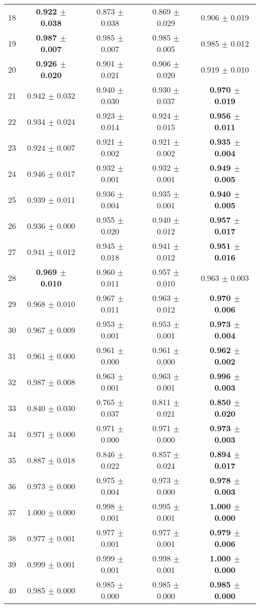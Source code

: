 \begin{table}[!ht]
{\begin{tabular}{r c c c c}
18 & \textbf{0.922 $\pm$ 0.038} & 0.873 $\pm$ 0.038 & 0.869 $\pm$ 0.029 & 0.906 $\pm$ 0.019 \\
19 & \textbf{0.987 $\pm$ 0.007} & 0.985 $\pm$ 0.007 & 0.985 $\pm$ 0.005 & 0.985 $\pm$ 0.012 \\
20 & \textbf{0.926 $\pm$ 0.020} & 0.901 $\pm$ 0.021 & 0.906 $\pm$ 0.020 & 0.919 $\pm$ 0.010 \\
21 & 0.942 $\pm$ 0.032 & 0.940 $\pm$ 0.030 & 0.930 $\pm$ 0.037 & \textbf{0.970 $\pm$ 0.019} \\
22 & 0.934 $\pm$ 0.024 & 0.923 $\pm$ 0.014 & 0.924 $\pm$ 0.015 & \textbf{0.956 $\pm$ 0.011} \\
23 & 0.924 $\pm$ 0.007 & 0.921 $\pm$ 0.002 & 0.921 $\pm$ 0.002 & \textbf{0.935 $\pm$ 0.004} \\
24 & 0.946 $\pm$ 0.017 & 0.932 $\pm$ 0.001 & 0.932 $\pm$ 0.001 & \textbf{0.949 $\pm$ 0.005} \\
25 & 0.939 $\pm$ 0.011 & 0.936 $\pm$ 0.004 & 0.935 $\pm$ 0.001 & \textbf{0.940 $\pm$ 0.005} \\
26 & 0.936 $\pm$ 0.000 & 0.955 $\pm$ 0.020 & 0.940 $\pm$ 0.012 & \textbf{0.957 $\pm$ 0.017} \\
27 & 0.941 $\pm$ 0.012 & 0.945 $\pm$ 0.018 & 0.941 $\pm$ 0.012 & \textbf{0.951 $\pm$ 0.016} \\
28 & \textbf{0.969 $\pm$ 0.010} & 0.960 $\pm$ 0.011 & 0.957 $\pm$ 0.010 & 0.963 $\pm$ 0.003 \\
29 & 0.968 $\pm$ 0.010 & 0.967 $\pm$ 0.011 & 0.963 $\pm$ 0.012 & \textbf{0.970 $\pm$ 0.006} \\
30 & 0.967 $\pm$ 0.009 & 0.953 $\pm$ 0.001 & 0.953 $\pm$ 0.001 & \textbf{0.973 $\pm$ 0.004} \\
31 & 0.961 $\pm$ 0.000 & 0.961 $\pm$ 0.000 & 0.961 $\pm$ 0.000 & \textbf{0.962 $\pm$ 0.002} \\
32 & 0.987 $\pm$ 0.008 & 0.963 $\pm$ 0.001 & 0.963 $\pm$ 0.001 & \textbf{0.996 $\pm$ 0.003} \\
33 & 0.840 $\pm$ 0.030 & 0.765 $\pm$ 0.037 & 0.811 $\pm$ 0.021 & \textbf{0.850 $\pm$ 0.020} \\
34 & 0.971 $\pm$ 0.000 & 0.971 $\pm$ 0.000 & 0.971 $\pm$ 0.000 & \textbf{0.973 $\pm$ 0.003} \\
35 & 0.887 $\pm$ 0.018 & 0.846 $\pm$ 0.022 & 0.857 $\pm$ 0.024 & \textbf{0.894 $\pm$ 0.017} \\
36 & 0.973 $\pm$ 0.000 & 0.975 $\pm$ 0.004 & 0.973 $\pm$ 0.000 & \textbf{0.978 $\pm$ 0.003} \\
37 & 1.000 $\pm$ 0.000 & 0.998 $\pm$ 0.001 & 0.995 $\pm$ 0.001 & \textbf{1.000 $\pm$ 0.000} \\
38 & 0.977 $\pm$ 0.001 & 0.977 $\pm$ 0.001 & 0.977 $\pm$ 0.001 & \textbf{0.979 $\pm$ 0.006} \\
39 & 0.999 $\pm$ 0.001 & 0.999 $\pm$ 0.001 & 0.998 $\pm$ 0.001 & \textbf{1.000 $\pm$ 0.000} \\
40 & 0.985 $\pm$ 0.000 & 0.985 $\pm$ 0.000 & 0.985 $\pm$ 0.000 & \textbf{0.985 $\pm$ 0.000} \\
\end{tabular}}
\end{table}
